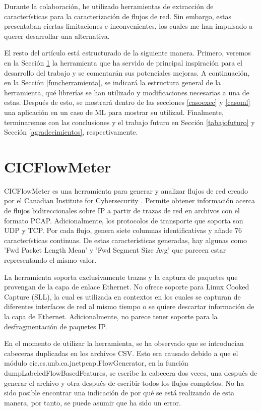 \documentclass[10pt,a4paper,twoside]{article}
\begin{document}
\begin{multicols*}{2}
    Durante la colaboración, he utilizado herramientas de extracción de características para la caracterización de flujos de red. Sin embargo, estas presentaban ciertas limitaciones e inconvenientes, los cuales me han impulsado a querer desarrollar una alternativa.

    El resto del artículo está estructurado de la siguiente manera. Primero, veremos en la Sección \ref{cicflowmeter} la herramienta que ha servido de principal inspiración para el desarrollo del trabajo y se comentarán sus potenciales mejoras. A continuación, en la Sección \ref{funcherramienta}, se indicará la estructura general de la herramienta, qué librerías se han utilizado y modificaciones necesarias a una de estas. Después de esto, se mostrará dentro de las secciones \ref{casoexec} y \ref{casoml} una aplicación en un caso de ML para mostrar su utilizad. Finalmente, terminaremos con las conclusiones y el trabajo futuro en Sección \ref{tabajofuturo} y Sección \ref{agradecimientos}, respectivamente.

    \section{CICFlowMeter} \label{cicflowmeter}

    CICFlowMeter es una herramienta para generar y analizar flujos de red creado por el Canadian Institute for Cybersecurity \cite{cicflowpost} \cite{icissp17} \cite{cicflowrepo}. Permite obtener información acerca de flujos bidireccionales sobre IP a partir de trazas de red en archivos con el formato PCAP. Adicionalmente, los protocolos de transporte que soporta son UDP y TCP. Por cada flujo, genera siete columnas identificativas y añade 76 características continuas. De estas características generadas, hay algunas como 'Fwd Packet Length Mean' y 'Fwd Segment Size Avg' que parecen estar representando el mismo valor.

    La herramienta soporta exclusivamente trazas y la captura de paquetes que provengan de la capa de enlace Ethernet. No ofrece soporte para Linux Cooked Capture (SLL), la cual es utilizada en contextos en los cuales se capturan de diferentes interfaces de red al mismo tiempo o se quiere descartar información de la capa de Ethernet. Adicionalmente, no parece tener soporte para la desfragmentación de paquetes IP.

    En el momento de utilizar la herramienta, se ha observado que se introducían cabeceras duplicadas en los archivos CSV. Esto era causado debido a que el módulo cic.cs.unb.ca.jnetpcap.FlowGenerator, en la función dumpLabeledFlowBasedFeatures, se escribe la cabecera dos veces, una después de generar el archivo y otra después de escribir todos los flujos completos. No ha sido posible encontrar una indicación de por qué se está realizando de esta manera, por tanto, se puede asumir que ha sido un error.


\end{multicols*}
\end{document}
